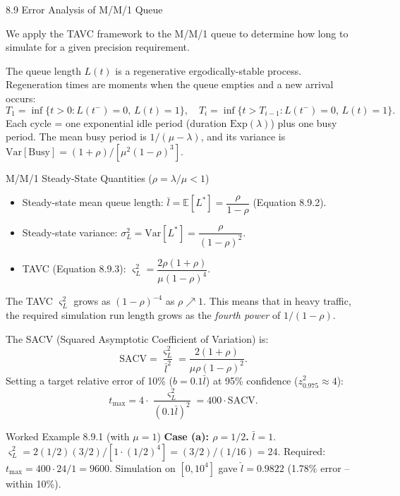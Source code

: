 \documentclass[aspectratio=169,10pt]{beamer}
\newcommand{\E}{\mathbb{E}}
\begin{document}
\begin{frame}[allowframebreaks]{8.9 Error Analysis of M/M/1 Queue}

We apply the TAVC framework to the M/M/1 queue to determine how long to
simulate for a given precision requirement.

The queue length $L(t)$ is a regenerative ergodically-stable process.
Regeneration times are moments when the queue empties and a new arrival occurs:
\[
  T_1 = \inf\{t > 0 : L(t^-) = 0,\, L(t) = 1\},
  \quad T_i = \inf\{t > T_{i-1} : L(t^-) = 0,\, L(t) = 1\}.
\]
Each cycle = one exponential idle period (duration $\mathrm{Exp}(\lambda)$) plus
one busy period.  The mean busy period is $1/(\mu-\lambda)$, and its variance is
$\mathrm{Var[\text{Busy}]} = (1+\rho)/[\mu^2(1-\rho)^3]$.

\begin{block}{M/M/1 Steady-State Quantities ($\rho = \lambda/\mu < 1$)}
\begin{itemize}
  \item Steady-state mean queue length: $\bar{l} = \E[L^*] = \dfrac{\rho}{1-\rho}$
        (Equation 8.9.2).
  \item Steady-state variance: $\sigma_L^2 = \mathrm{Var}[L^*] = \dfrac{\rho}{(1-\rho)^2}$.
  \item TAVC (Equation 8.9.3): $\varsigma_L^2 = \dfrac{2\rho(1+\rho)}{\mu(1-\rho)^4}$.
\end{itemize}
\end{block}

The TAVC $\varsigma_L^2$ grows as $(1-\rho)^{-4}$ as $\rho \nearrow 1$.  This
means that in heavy traffic, the required simulation run length grows as the
\emph{fourth power} of $1/(1-\rho)$.

\framebreak

The SACV (Squared Asymptotic Coefficient of Variation) is:
\[
  \mathrm{SACV} = \frac{\varsigma_L^2}{\bar{l}^2}
               = \frac{2(1+\rho)}{\mu\rho(1-\rho)^2}.
\]
Setting a target relative error of 10\% ($b = 0.1\bar{l}$) at 95\% confidence
($z_{0.975}^2 \approx 4$):
\[
  t_{\max} = 4 \cdot \frac{\varsigma_L^2}{(0.1\bar{l})^2} = 400 \cdot \mathrm{SACV}.
\]

\begin{exampleblock}{Worked Example 8.9.1 (with $\mu = 1$)}
\textbf{Case (a): $\rho = 1/2$.}
$\bar{l} = 1$.
$\varsigma_L^2 = 2(1/2)(3/2)/[1 \cdot (1/2)^4] = (3/2)/(1/16) = 24$.
Required: $t_{\max} = 400 \cdot 24/1 = 9600$.
Simulation on $[0, 10^4]$ gave $\hat{l} = 0.9822$ (1.78\% error -- within 10\%).


\end{exampleblock}
\end{frame}
\end{document}

